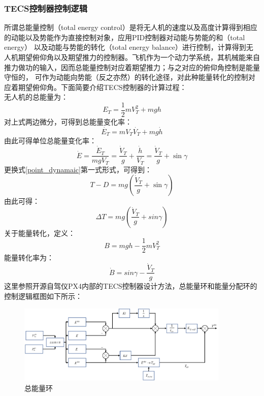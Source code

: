 \subsubsection{TECS控制器控制逻辑}
所谓总能量控制（total energy control）是将无人机的速度以及高度计算得到相应的动能以及势能作为直接控制对象，应用PID控制器对动能与势能的和（total energy）
以及动能与势能的转化（total energy balance）进行控制，计算得到无人机期望俯仰角以及期望推力的控制器。飞机作为一个动力学系统，其机械能来自推力做功的输入，因而总能量控制对应着期望推力；与之对应的俯仰角控制是能量守恒的，
可作为动能向势能（反之亦然）的转化途径，对此种能量转化的控制对应着期望俯仰角。下面简要介绍TECS控制器的计算过程：
\\
无人机的总能量为：
\begin{equation}
    E_T=\frac{1}{2}mV_T^2+mgh
    \label{ET}
\end{equation}
对上式两边微分，可得到总能量变化率：
\begin{equation}
    \dot{E_T}=mV_T\dot{V_T}+mg\dot{h}
    \label{ET_rate}
\end{equation}
由此可得单位总能量变化率：
\begin{equation}
    \dot{E}=\frac{\dot{E}_{T}}{m g V_{T}}=\frac{\dot{V}_{T}}{g}+\frac{\dot{h}}{V_{T}}=\frac{\dot{V}_{T}}{g}+\sin \gamma
    \label{specif_ET_rate}
\end{equation}
更换式\ref{point_dynamaic}第一式形式，可得到：
\begin{equation}
    T-D=m g\left(\frac{\dot{V}_{T}}{g}+\sin \gamma\right)
    \label{point_dynamaic_change}
\end{equation}
由此可得：
\begin{equation}
    \Delta T=m g\left(\frac{\dot{V}_{T}}{g}+sin\gamma\right)
    \label{thrust}
\end{equation}
关于能量转化，定义：
\begin{equation}
    B=m g h-\frac{1}{2} m V_{T}^{2}
\end{equation}
能量转化率为：
\begin{equation}
\dot{B}=sin\gamma-\frac{\dot{V}_{T}}{g}
\end{equation}
这里参照开源自驾仪PX4内部的TECS控制器设计方法，总能量环和能量分配环的控制逻辑框图如下所示：
\begin{figure}[H]
    \centering
    \includegraphics[width=0.9\textwidth]{figures/c3/TECS_throttle.jpg}
    \caption{总能量环}\label{fig:total_energy}
\end{figure}
